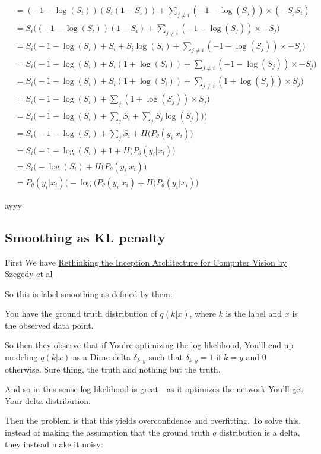 \documentclass{article}
\begin{document}
		\begin{align}
			&= (-1-\log(S_i))(S_i(1-S_i)) + \sum_{j\neq i} (-1-\log(S_j))\times (-S_jS_i)\\
			&= S_i\bigg((-1-\log(S_i))(1-S_i) + \sum_{j\neq i} (-1-\log(S_j))\times -S_j\bigg)\\
			&= S_i\bigg(-1-\log(S_i) + S_i + S_i\log(S_i) + \sum_{j\neq i} (-1-\log(S_j))\times -S_j\bigg)\\
			&= S_i\bigg(-1-\log(S_i) + S_i(1 +\log(S_i)) + \sum_{j\neq i} (-1-\log(S_j))\times -S_j\bigg)\\
			&= S_i\bigg(-1-\log(S_i) + S_i(1 +\log(S_i)) + \sum_{j\neq i} (1+\log(S_j))\times S_j\bigg)\\
			&= S_i\bigg(-1-\log(S_i) + \sum_{j} (1+\log(S_j))\times S_j\bigg)\\
			&= S_i\bigg(-1-\log(S_i) + \sum_{j} S_i +\sum_{j}S_j\log(S_j))\bigg)\\
			&= S_i\bigg(-1-\log(S_i) + \sum_{j} S_i +H(P_\theta(y_i|x_i)\bigg)\\
			&= S_i\bigg(-1-\log(S_i) + 1 +H(P_\theta(y_i|x_i)\bigg)\\
			&= S_i\bigg(-\log(S_i)+H(P_\theta(y_i|x_i)\bigg)\\
			&= P_\theta(y_i|x_i)\bigg(-\log(P_\theta(y_i|x_i)+H(P_\theta(y_i|x_i)\bigg)
		\end{align}
		
		ayyy
		
	\subsection{Smoothing as KL penalty}
	
		First We have \href{https://arxiv.org/pdf/1512.00567.pdf}{Rethinking the Inception Architecture for Computer Vision by Szegedy et al}
		
		So this is label smoothing as defined by them:
		
		You have the ground truth distribution of $q(k|x)$, where $k$ is the label and $x$ is the observed data point. 
		
		So then they observe that if You're optimizing the log likelihood, You'll end up modeling $q(k|x)$ as a Dirac delta $\delta_{k, y}$ such that $\delta_{k, y} = 1$ if $k=y$ and 0 otherwise. Sure thing, the truth and nothing but the truth.
		
		And so in this sense log likelihood is great - as it optimizes the network You'll get Your delta distribution.
		
		Then the problem is that this yields overconfidence and overfitting. To solve this, instead of making the assumption that the ground truth $q$ distribution is a delta, they instead make it noisy:
		
\end{document}
